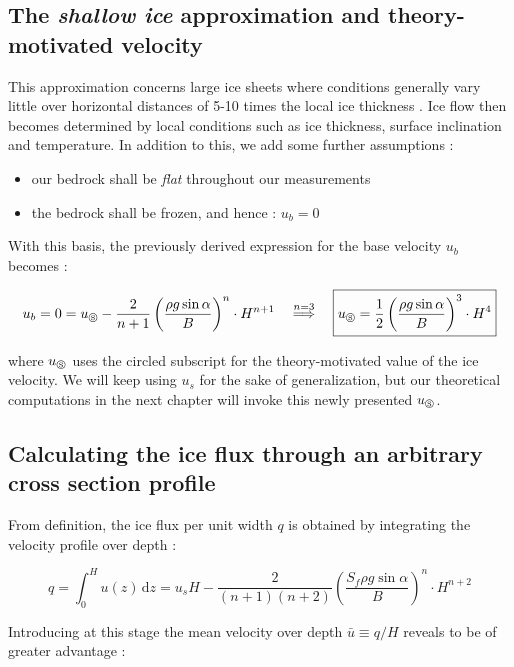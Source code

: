 \subsection*{The \textit{shallow ice} approximation and theory-motivated velocity}

This approximation concerns large ice sheets where conditions generally vary little over horizontal distances of 5-10 times the local ice thickness \cite{Greve2009}. Ice flow then becomes determined by local conditions such as ice thickness, surface inclination and temperature.
In addition to this, we add some further assumptions :

\begin{itemize}
    \item our bedrock shall be \textit{flat} throughout our measurements
    \item the bedrock shall be frozen, and hence : $u_b = 0$
\end{itemize}

With this basis, the previously derived expression for the base velocity $u_b$ becomes :

\begin{equation}u_b = 0 = u_\circledS - \frac{2}{n + 1} \left( \frac{\rho g \sin{\alpha}}{B}\right)^n \cdot H^{n+1}
\quad
\stackrel{n = 3}{\Longrightarrow}
\quad
\boxed{u_\circledS = \frac{1}{2} \left( \frac{\rho g \sin{\alpha}}{B}\right)^3 \cdot H^4}
\label{GPS:eq:sia}
\end{equation}

where $u_\circledS$ uses the circled subscript for the theory-motivated value of the ice velocity. We will keep using $u_s$ for the sake of generalization, but our theoretical computations in the next chapter will invoke this newly presented $u_\circledS$. 


\subsection*{Calculating the ice flux through an arbitrary cross section profile}

From definition, the ice flux per unit width $q$ is obtained by integrating the velocity profile over depth :

\begin{equation}q = \int_0^H u(z) \, \mathrm{d} z = u_s H - \frac{2}{(n+1)(n+2)} \left( \frac{S_f \rho g \sin{\alpha}}{B}\right)^n \cdot H^{n+2}\end{equation}

Introducing at this stage the mean velocity over depth $\bar{u} \equiv q/H$ reveals to be of greater advantage :

